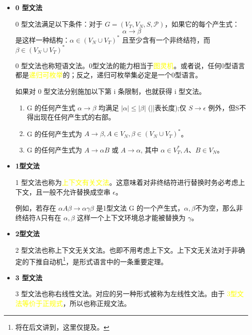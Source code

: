 \begin{itemize}
    \item \textbf{0 型文法}
    
    0 型文法满足以下条件：对于 $G=(V_T,V_N,S,\mathcal{P})$，如果它的每个产生式：
    \[\alpha \rightarrow \beta\]
    是这样一种结构：$\alpha \in (V_N \cup V_T)^*$ 且至少含有一个非终结符，而 $\beta \in (V_N \cup V_T)^*$
    
    0 型文法也称短语文法。0型文法的能力相当于\textcolor{mark}{图灵机}。或者说，任何0型语言都是\textcolor{mark}{递归可枚举}的；反之，递归可枚举集必定是一个0型语言。

    如果对 0 型文法分别施加以下第 i 条限制，也就获得 i 型文法。
    \begin{enumerate}
        \item G 的任何产生式 $\alpha \rightarrow \beta$ 均满足 $|\alpha| \leq |\beta|$ (||表长度);仅 $S \rightarrow \epsilon$ 例外，但S不得出现在任何产生式的右部。
        \item G 的任何产生式为 $A\rightarrow \beta,A\in V_N,\beta \in (V_N \cup V_T)^*$。
        \item G 的任何产生式为 $A\rightarrow\alpha B$ 或 $A \rightarrow \alpha$, 其中 $\alpha \in V_T^*,A、B\in V_N$。
    \end{enumerate}

    \item \textbf{1型文法}
    
    1 型文法也称为\textcolor{mark}{上下文有关文法}。这意味着对非终结符进行替换时务必考虑上下文，且一般不允许替换成空串 $\epsilon$。

    例如，若存在 $\alpha A \beta \rightarrow \alpha \gamma \beta$ 是1型文法 G 的一个产生式，$\alpha,\beta$不为空，那么非终结符A只有在 $\alpha,\beta$ 这样一个上下文环境总才能被替换为 $\gamma$。

    \item \textbf{2型文法}
    
    2 型文法也称\textcolor{imp}{上下文无关文法}。也即不用考虑上下文。上下文无关法对于非确定的下推自动机\footnote{将在后文讲到，这里仅提及。}，是形式语言中的一条重要定理。

    \item \textbf{3 型文法}
    
    3 型文法也称右线性文法。对应的另一种形式被称为左线性文法。由于 \textcolor{mark}{3型文法等价于正规式}，所以也称正规文法。
\end{itemize}

